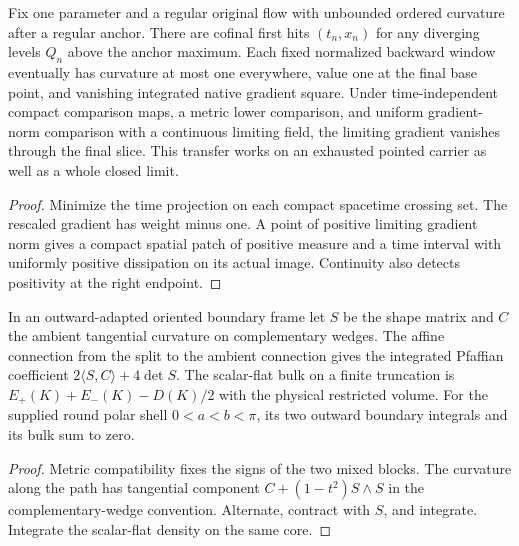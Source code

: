 \begin{proposition}
\label{prop:ed51-terminal}
\leanok
Fix one parameter and a regular original flow with unbounded ordered curvature
after a regular anchor. There are cofinal first hits $(t_n,x_n)$ for any
diverging levels $Q_n$ above the anchor maximum. Each fixed normalized
backward window eventually has curvature at most one everywhere, value
one at the final base point, and vanishing integrated native gradient square.
Under time-independent compact comparison maps, a metric lower comparison,
and uniform gradient-norm comparison with a continuous limiting field, the
limiting gradient vanishes through the final slice. This transfer works
on an exhausted pointed carrier as well as a whole closed limit.
\end{proposition}
\begin{proof}
\leanok
Minimize the time projection on each compact spacetime crossing set.
The rescaled gradient has weight minus one. A point of positive limiting
gradient norm gives a compact spatial patch of positive measure and a
time interval with uniformly positive dissipation on its actual image.
Continuity also detects positivity at the right endpoint.
\end{proof}

\begin{proposition}
\label{prop:ed51-pfaffian}
\leanok
In an outward-adapted oriented boundary frame let $S$ be the shape
matrix and $C$ the ambient tangential curvature on complementary
wedges. The affine connection from the split to the ambient connection
gives the integrated Pfaffian coefficient $2\langle S,C\rangle+4\det S$.
The scalar-flat bulk on a finite truncation is
$E_+(K)+E_-(K)-D(K)/2$ with the physical restricted volume.
For the supplied round polar shell $0<a<b<\pi$, its two outward
boundary integrals and its bulk sum to zero.
\end{proposition}
\begin{proof}
\leanok
Metric compatibility fixes the signs of the two mixed blocks. The curvature
along the path has tangential component $C+(1-t^2)S\wedge S$ in the
complementary-wedge convention. Alternate, contract with $S$, and integrate.
Integrate the scalar-flat density on the same core.
\end{proof}

